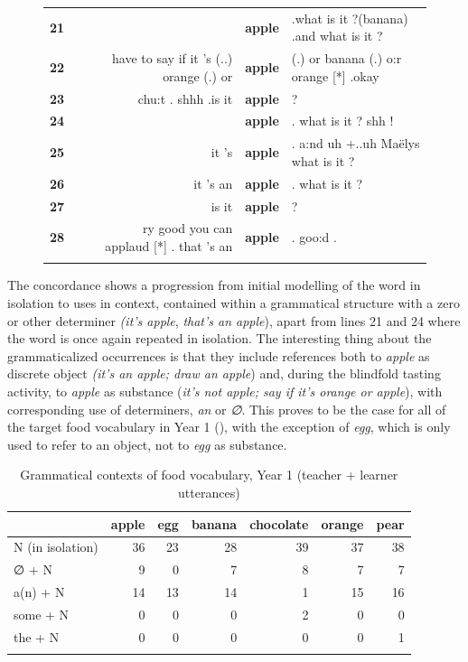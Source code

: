 \documentclass[output=paper,colorlinks,citecolor=brown,modfonts,nonflat]{../langscibook}
\begin{document}
\begin{figure}
{\begin{tabular}{l@{}l@{}lr@{~}l@{~}l}
 \textbf{21} &  & &  & \textbf{apple} & .what is it ?(banana) .and what is it ?\\
 \textbf{22} &  & &  have to say if it 's (..) orange (.) or & \textbf{apple} & (.) or banana (.) o:r orange [*] .okay \\
 \textbf{23} &  & &  chu:t . shhh .is it & \textbf{apple} & ?\\
 \textbf{24} &  & &  & \textbf{apple} & . what is it ? shh !\\
 \textbf{25} &  & &  it 's & \textbf{apple} & . a:nd uh +..uh Maëlys what is it ? \\
 \textbf{26} &  & &  it 's an & \textbf{apple} & . what is it ? \\
 \textbf{27} &  & &  is it & \textbf{apple} & ? \\
 \textbf{28} &  & &  ry good you can applaud [*] . that 's an & \textbf{apple} & . goo:d . \\
\lspbottomrule
\end{tabular}
}
\end{figure}

The concordance shows a progression from initial modelling of the word in isolation to uses in context, contained within a grammatical structure with a zero or other determiner \textit{(it’s apple}, \textit{that’s an apple}), apart from lines 21 and 24 where the word is once again repeated in isolation. The interesting thing about the grammaticalized occurrences is that they include references both to \textit{apple} as discrete object \textit{(it’s an apple; draw an apple}) and, during the blindfold tasting activity, to \textit{apple} as substance (\textit{it’s not apple; say if it’s orange or apple}), with corresponding use of determiners, \textit{an} or \textit{∅}. This proves to be the case for all of the target food vocabulary in Year 1 (), with the exception of \textit{egg}, which is only used to refer to an object, not to \textit{egg} as substance.

\begin{table}
\caption{\label{tab:hilton:4}Grammatical contexts of food vocabulary, Year 1 (teacher + learner utterances)}

\begin{tabular}{lrrrrrr}
\lsptoprule
&  {apple} &  {egg} &  {banana} &  {chocolate} &  {orange} &  {pear}\\
\midrule
N (in isolation) & 36 & 23 & 28 & 39 & 37 & 38\\
∅ + N & 9 & 0 & 7 & 8 & 7 & 7\\
a(n) + N & 14 & 13 & 14 & 1 & 15 & 16\\
some + N & 0 & 0 & 0 & 2 & 0 & 0\\
the + N & 0 & 0 & 0 & 0 & 0 & 1\\
\lspbottomrule
\end{tabular}
\end{table}
\end{document}
